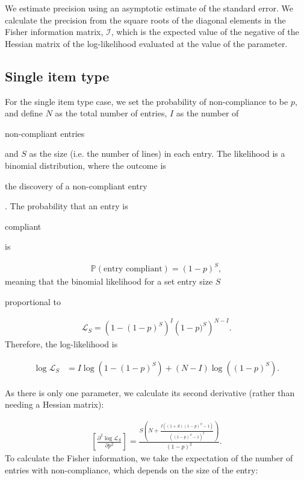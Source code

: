 \documentclass{article}
\newif\ifproofread
\newcommand{\rev}[1]{%
\ifproofread
\hl{#1}%
\else
#1%
\fi
}
\begin{document}
\rev{We estimate precision using an asymptotic estimate of the standard error. We calculate  the precision from the square roots of the diagonal elements in the Fisher information matrix, $\mathcal{I}$, which is the expected value of the negative of the Hessian matrix of the log-likelihood evaluated at the value of the parameter.}


\subsection{Single item type}
For the single item type case, we set the probability of non-compliance to be \(p\), and define \(N\) as the total number of entries, \(I\) as the number of \rev{non-compliant entries} and \(S\) as the size (i.e. the number of lines) in each entry. The likelihood is a binomial distribution, where the outcome is \rev{the discovery of a non-compliant entry}. The probability that an entry is \rev{compliant} is

\begin{align}
\mathbb{P}(\text{entry compliant}) = (1-p)^S,
\end{align}
meaning that the binomial likelihood for a set entry size $S$ \rev{proportional to}

\begin{align}
\mathcal{L}_S = \left(1-(1-p)^S\right)^I\left(1-p)^S\right)^{N-I}. \label{eq:entry_mode_like}
\end{align}
Therefore, the log-likelihood is

\begin{align}
  \log\mathcal{L}_S& = {I} \log\left(1-(1-p)^S\right)+(N-I)\log\left((1-p)^S\right).
  \label{eq:loglikelihood_arbitrary_entry_size}
\end{align}
\ifproofread
\textbf{\hl{Edited: omitted generalisation to varying entry sizes.}}
\fi
As there is only one parameter, we calculate its second derivative (rather than needing a Hessian matrix):

\begin{align}
\left[\frac{\partial^2 \log\mathcal{L}_S}{\partial p^2}\right]= 
\frac{S\left(N + \frac{I((1+S)(1-p)^S-1)}
{\left((1-p)^S-1 \right)^2} \right)}
{(1-p)^2}.\label{eq:loglike_2nd_deriv}
\end{align}
To calculate the Fisher information, we take the expectation of the number of entries with non-compliance, which depends on the size of the entry:
\end{document}
